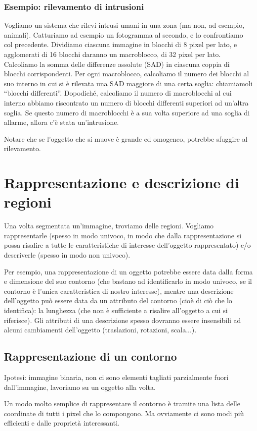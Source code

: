 \documentclass[a4paper,11pt]{article}
\begin{document}
\subsubsection{Esempio: rilevamento di intrusioni}
Vogliamo un sistema che rilevi intrusi umani in una zona (ma non, ad esempio, animali). Catturiamo ad esempio un fotogramma al secondo, e lo confrontiamo col
precedente. Dividiamo ciascuna immagine in blocchi di 8 pixel per lato, e agglomerati di 16 blocchi daranno un macroblocco, di 32 pixel per lato.
Calcoliamo la somma delle differenze assolute (SAD) in ciascuna coppia di blocchi corrispondenti. Per ogni macroblocco, calcoliamo il numero dei blocchi
al suo interno in cui si è rilevata una SAD maggiore di una certa soglia: chiamiamoli ``blocchi differenti''.
Dopodiché, calcoliamo il numero di macroblocchi al cui interno abbiamo riscontrato un numero di blocchi differenti superiori ad un'altra soglia. Se questo numero di
macroblocchi è a sua volta superiore ad una soglia di allarme, allora c'è stata un'intrusione.
\par
Notare che se l'oggetto che si muove è grande ed omogeneo, potrebbe sfuggire al rilevamento.

\newpage

\section{Rappresentazione e descrizione di regioni}
Una volta segmentata un'immagine, troviamo delle regioni. Vogliamo rappresentarle (spesso in modo univoco, in modo che dalla rappresentazione
si possa risalire a tutte le caratteristiche di interesse dell'oggetto rappresentato) e/o descriverle (spesso in modo non univoco).
\par
Per esempio, una rappresentazione di un oggetto potrebbe essere data dalla forma e dimensione del suo contorno (che bastano ad identificarlo in modo univoco,
se il contorno è l'unica caratteristica di nostro interesse),
mentre una descrizione dell'oggetto può essere data da un attributo del contorno (cioè di ciò che lo identifica): la lunghezza (che non
è sufficiente a risalire all'oggetto a cui si riferisce). Gli attributi di una descrizione spesso dovranno essere insensibili ad alcuni cambiamenti
dell'oggetto (traslazioni, rotazioni, scala...).

\subsection{Rappresentazione di un contorno}
Ipotesi: immagine binaria, non ci sono elementi tagliati parzialmente fuori dall'immagine, lavoriamo su un oggetto alla volta.
\par
Un modo molto semplice di rappresentare il contorno è tramite una lista delle coordinate di tutti i pixel che lo compongono. Ma ovviamente ci sono modi
più efficienti e dalle proprietà interessanti.
\end{document}
